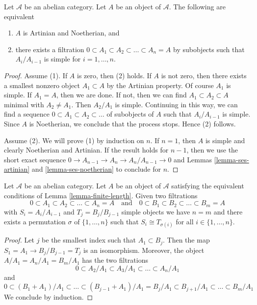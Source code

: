 \begin{lemma}
\label{lemma-finite-length}
Let $\mathcal{A}$ be an abelian category. Let $A$ be an object
of $\mathcal{A}$. The following are equivalent
\begin{enumerate}
\item $A$ is Artinian and Noetherian, and
\item there exists a filtration
$0 \subset A_1 \subset A_2 \subset \ldots \subset A_n = A$
by subobjects such that $A_i/A_{i - 1}$ is simple for $i = 1, \ldots, n$.
\end{enumerate}
\end{lemma}

\begin{proof}
Assume (1). If $A$ is zero, then (2) holds. If $A$ is not zero, then
there exists a smallest nonzero object $A_1 \subset A$ by the Artinian
property. Of course $A_1$ is simple. If $A_1 = A$, then we are done.
If not, then we can find $A_1 \subset A_2 \subset A$ minimal
with $A_2 \not = A_1$. Then $A_2/A_1$ is simple. Continuing in this way, we
can find a sequence $0 \subset A_1 \subset A_2 \subset \ldots $
of subobjects of $A$ such that $A_i/A_{i - 1}$ is simple. Since $A$
is Noetherian, we conclude that the process stops. Hence (2) follows.

\medskip\noindent
Assume (2). We will prove (1) by induction on $n$. If $n = 1$, then
$A$ is simple and clearly Noetherian and Artinian. If the result holds
for $n - 1$, then we use the short exact sequence
$0 \to A_{n - 1} \to A_n \to A_n/A_{n - 1} \to 0$
and Lemmas \ref{lemma-ses-artinian} and \ref{lemma-ses-noetherian}
to conclude for $n$.
\end{proof}

\begin{lemma}
\label{lemma-jordan-holder}
Let $\mathcal{A}$ be an abelian category. Let $A$ be an object
of $\mathcal{A}$ satisfying the equivalent conditions of
Lemma \ref{lemma-finite-length}. Given two filtrations
$$
0 \subset A_1 \subset A_2 \subset \ldots \subset A_n = A
\quad\text{and}\quad
0 \subset B_1 \subset B_2 \subset \ldots \subset B_m = A
$$
with $S_i = A_i/A_{i - 1}$ and $T_j = B_j/B_{j - 1}$ simple objects we have
$n = m$ and there exists a permutation $\sigma$ of $\{1, \ldots, n\}$
such that $S_i \cong T_{\sigma(i)}$ for all $i \in \{1, \ldots, n\}$.
\end{lemma}

\begin{proof}
Let $j$ be the smallest index such that $A_1 \subset B_j$.
Then the map $S_1 = A_1 \to B_j/B_{j - 1} = T_j$ is an isomorphism.
Moreover, the object $A/A_1 = A_n/A_1 = B_m/A_1$
has the two filtrations
$$
0 \subset A_2/A_1 \subset A_3/A_1 \subset \ldots \subset A_n/A_1
$$
and
$$
0 \subset (B_1 + A_1)/A_1 \subset \ldots \subset
(B_{j - 1} + A_1)/A_1 = B_j/A_1 \subset B_{j + 1}/A_1
\subset \ldots \subset B_m/A_1
$$
We conclude by induction.
\end{proof}








